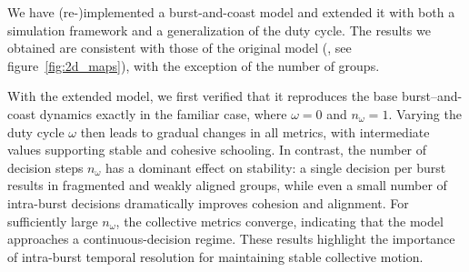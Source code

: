 We have (re-)implemented a burst-and-coast model and extended it with both a simulation framework and a generalization of the duty cycle.
The results we obtained are consistent with those of the original model (\cite{Wang2025_fish}, see figure~\ref{fig:2d_maps}), with the exception of the number of groups.

With the extended model, we first verified that it reproduces the base burst–and-coast dynamics exactly in the familiar case, where $\omega = 0$ and $n_\omega = 1$. Varying the duty cycle $\omega$ then leads to gradual changes in all metrics, with intermediate values supporting stable and cohesive schooling. In contrast, the number of decision steps $n_\omega$ has a dominant effect on stability: a single decision per burst results in fragmented and weakly aligned groups, while even a small number of intra-burst decisions dramatically improves cohesion and alignment. For sufficiently large $n_\omega$, the collective metrics converge, indicating that the model approaches a continuous-decision regime. These results highlight the importance of intra-burst temporal resolution for maintaining stable collective motion.

